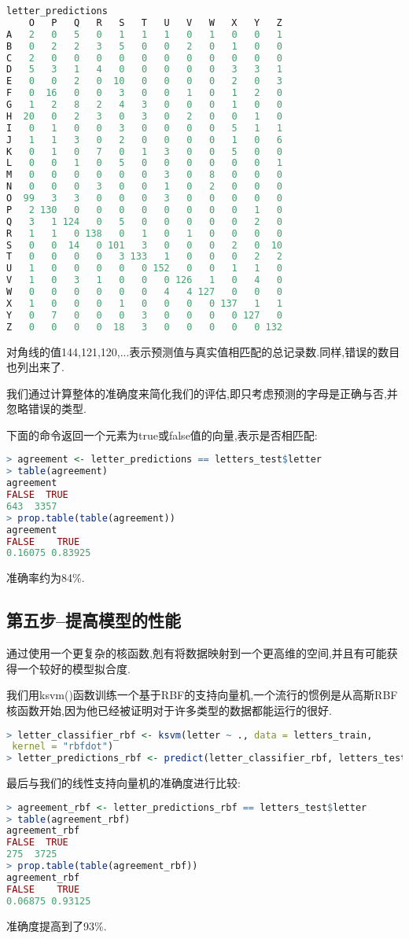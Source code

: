 \documentclass[11pt,a4paper,oneside]{book}
\begin{document}
\begin{lstlisting}[language=r]
letter_predictions  
    O   P   Q   R   S   T   U   V   W   X   Y   Z
A   2   0   5   0   1   1   1   0   1   0   0   1
B   0   2   2   3   5   0   0   2   0   1   0   0
C   2   0   0   0   0   0   0   0   0   0   0   0
D   5   3   1   4   0   0   0   0   0   3   3   1
E   0   0   2   0  10   0   0   0   0   2   0   3
F   0  16   0   0   3   0   0   1   0   1   2   0
G   1   2   8   2   4   3   0   0   0   1   0   0
H  20   0   2   3   0   3   0   2   0   0   1   0
I   0   1   0   0   3   0   0   0   0   5   1   1
J   1   1   3   0   2   0   0   0   0   1   0   6
K   0   1   0   7   0   1   3   0   0   5   0   0
L   0   0   1   0   5   0   0   0   0   0   0   1
M   0   0   0   0   0   0   3   0   8   0   0   0
N   0   0   0   3   0   0   1   0   2   0   0   0
O  99   3   3   0   0   0   3   0   0   0   0   0
P   2 130   0   0   0   0   0   0   0   0   1   0
Q   3   1 124   0   5   0   0   0   0   0   2   0
R   1   1   0 138   0   1   0   1   0   0   0   0
S   0   0  14   0 101   3   0   0   0   2   0  10
T   0   0   0   0   3 133   1   0   0   0   2   2
U   1   0   0   0   0   0 152   0   0   1   1   0
V   1   0   3   1   0   0   0 126   1   0   4   0
W   0   0   0   0   0   0   4   4 127   0   0   0
X   1   0   0   0   1   0   0   0   0 137   1   1
Y   0   7   0   0   0   3   0   0   0   0 127   0
Z   0   0   0   0  18   3   0   0   0   0   0 132
\end{lstlisting}
对角线的值144,121,120,...表示预测值与真实值相匹配的总记录数.同样,错误的数目也列出来了.

我们通过计算整体的准确度来简化我们的评估,即只考虑预测的字母是正确与否,并忽略错误的类型.

下面的命令返回一个元素为true或false值的向量,表示是否相匹配:
\begin{lstlisting}[language=r]
> agreement <- letter_predictions == letters_test$letter
> table(agreement)
agreement
FALSE  TRUE 
643  3357 
> prop.table(table(agreement))
agreement
FALSE    TRUE 
0.16075 0.83925 
\end{lstlisting}
准确率约为84\%.

\subsection{第五步--提高模型的性能}
通过使用一个更复杂的核函数,剋有将数据映射到一个更高维的空间,并且有可能获得一个较好的模型拟合度.

我们用ksvm()函数训练一个基于RBF的支持向量机,一个流行的惯例是从高斯RBF核函数开始,因为他已经被证明对于许多类型的数据都能运行的很好.
\begin{lstlisting}[language=r]
> letter_classifier_rbf <- ksvm(letter ~ ., data = letters_train,
 kernel = "rbfdot")
> letter_predictions_rbf <- predict(letter_classifier_rbf, letters_test)
\end{lstlisting}
最后与我们的线性支持向量机的准确度进行比较:
\begin{lstlisting}[language=r]
> agreement_rbf <- letter_predictions_rbf == letters_test$letter
> table(agreement_rbf)
agreement_rbf
FALSE  TRUE 
275  3725 
> prop.table(table(agreement_rbf))
agreement_rbf
FALSE    TRUE 
0.06875 0.93125 
\end{lstlisting}
准确度提高到了93\%.
\end{document}
